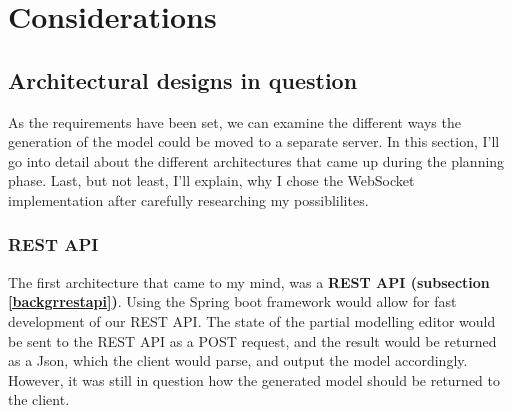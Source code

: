 \chapter{Considerations}\label{considerations}

\section{Architectural designs in question}
As the requirements have been set, we can examine the different ways the generation of the model could be
moved to a separate server. In this section, I'll go into detail about the different architectures that came up during
the planning phase. Last, but not least, I'll explain, why I chose the WebSocket implementation after carefully researching
my possiblilites.

\subsection{REST API}\label{restconsiderations}
The first architecture that came to my mind, was a \textbf{REST API (subsection \ref{backgrrestapi})}. Using the Spring boot framework would allow for fast development
of our REST API. The state of the partial modelling editor would be sent to the REST API as a POST request, and the result
would be returned as a Json, which the client would parse, and output the model accordingly. However, it was still in question
how the generated model should be returned to the client.
